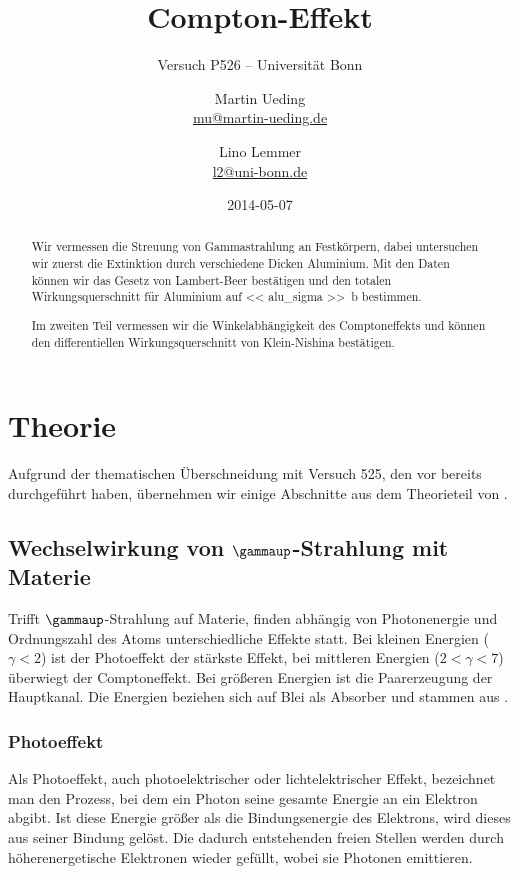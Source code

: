 \documentclass[11pt, ngerman, fleqn, DIV=15, headinclude, BCOR=2cm]{scrreprt}
\title{Compton-Effekt}
\subtitle{Versuch P526 -- Universität Bonn}
\author{
    Martin Ueding \\ \small{\href{mailto:mu@martin-ueding.de}{mu@martin-ueding.de}}
    \and
    Lino Lemmer \\
    \small{\href{mailto:l2@uni-bonn.de}{l2@uni-bonn.de}}
}
\date{2014-05-07}
\begin{document}
\maketitle

\begin{abstract}
    Wir vermessen die Streuung von Gammastrahlung an Festkörpern, dabei
    untersuchen wir zuerst die Extinktion durch verschiedene Dicken Aluminium.
    Mit den Daten können wir das Gesetz von Lambert-Beer bestätigen und den
    totalen Wirkungsquerschnitt für Aluminium auf \SI{<< alu_sigma >>}{\barn}
    bestimmen.

    Im zweiten Teil vermessen wir die Winkelabhängigkeit des Comptoneffekts und
    können den differentiellen Wirkungsquerschnitt von Klein-Nishina
    bestätigen.
\end{abstract}

\tableofcontents

\chapter{Theorie}

Aufgrund der thematischen Überschneidung mit Versuch 525, den vor bereits
durchgeführt haben, übernehmen wir einige Abschnitte aus dem Theorieteil von
\parencite{Ueding/525}.

\section{Wechselwirkung von $\gammaup$-Strahlung mit Materie}
\label{sec:WW}

Trifft $\gammaup$-Strahlung auf Materie, finden abhängig von Photonenergie und
Ordnungszahl des Atoms unterschiedliche Effekte statt. Bei kleinen Energien
($\gamma < 2$) ist der Photoeffekt der stärkste Effekt, bei mittleren Energien
($2 < \gamma < 7$) überwiegt der Comptoneffekt. Bei größeren Energien ist die
Paarerzeugung der Hauptkanal. Die Energien beziehen sich auf Blei als Absorber
und stammen aus \parencite[Abbildung~17.31]{meschede-gerthsen_24}.

\subsection{Photoeffekt}

Als Photoeffekt, auch photoelektrischer oder lichtelektrischer Effekt,
bezeichnet man den Prozess, bei dem ein Photon seine gesamte Energie an ein
Elektron abgibt. Ist diese Energie größer als die Bindungsenergie des
Elektrons, wird dieses aus seiner Bindung gelöst. Die dadurch entstehenden
freien Stellen werden durch höherenergetische Elektronen wieder gefüllt, wobei
sie Photonen emittieren.
\end{document}
